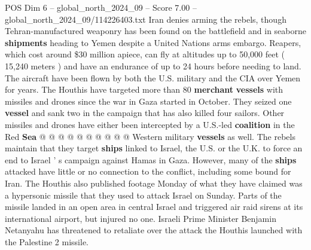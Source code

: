 \begin{textsample}{POS Dim 6 – global\_north\_2024\_09 – Score 7.00 – global\_north\_2024\_09/114226403.txt}
Iran denies arming the rebels, though Tehran-manufactured weaponry has been found on the battlefield and in seaborne \textbf{shipments} heading to Yemen despite a United Nations arms embargo.
Reapers, which cost around \$30 million apiece, can fly at altitudes up to 50,000 feet ( 15,240 meters ) and have an endurance of up to 24 hours before needing to land.
The aircraft have been flown by both the U.S. military and the CIA over Yemen for years.
The Houthis have targeted more than 80 \textbf{merchant} \textbf{vessels} with missiles and drones since the war in Gaza started in October.
They seized one \textbf{vessel} and sank two in the campaign that has also killed four sailors.
Other missiles and drones have either been intercepted by a U.S.-led \textbf{coalition} in the Red \textbf{Sea} @ @ @ @ @ @ @ @ @ @ Western military \textbf{vessels} as well.
The rebels maintain that they target \textbf{ships} linked to Israel, the U.S. or the U.K. to force an end to Israel ' s campaign against Hamas in Gaza.
However, many of the \textbf{ships} attacked have little or no connection to the conflict, including some bound for Iran.
The Houthis also published footage Monday of what they have claimed was a hypersonic missile that they used to attack Israel on Sunday.
Parts of the missile landed in an open area in central Israel and triggered air raid sirens at its international airport, but injured no one.
Israeli Prime Minister Benjamin Netanyahu has threatened to retaliate over the attack the Houthis launched with the Palestine 2 missile.

\end{textsample}
